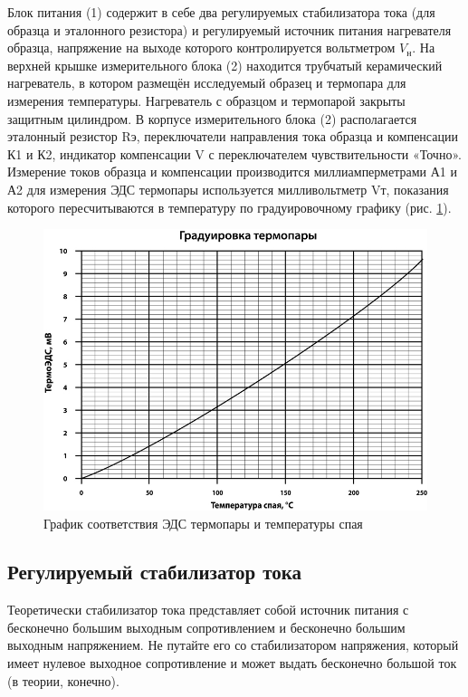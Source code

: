 		Блок питания (1) содержит в себе два регулируемых стабилизатора тока (для образца и эталонного резистора) и регулируемый
		источник питания нагревателя образца, напряжение на выходе которого контролируется вольтметром $V_\text{н}$. На верхней
		крышке измерительного блока (2) находится трубчатый керамический нагреватель, в котором размещён исследуемый образец и
		термопара для измерения температуры. Нагреватель с образцом и термопарой закрыты защитным цилиндром. В корпусе
		измерительного блока (2) располагается эталонный резистор Rэ, переключатели направления тока образца и компенсации К1 и
		К2, индикатор компенсации V с переключателем чувствительности «Точно». Измерение токов образца и компенсации
		производится миллиамперметрами А1 и А2 для измерения ЭДС термопары используется милливольтметр Vт, показания которого
		пересчитываются в температуру по градуировочному графику (рис. \ref{fig:6.3}).
		
		\begin{figure}[h!]
			\centering
			\includegraphics[width = .9\linewidth]{img/grad.jpg}
			\caption{График соответствия ЭДС термопары и температуры спая}
			\label{fig:6.3}
		\end{figure}
		
		
		\subsection{Регулируемый стабилизатор тока}
		Теоретически стабилизатор тока представляет собой источник питания с бесконечно большим выходным сопротивлением и
		бесконечно большим выходным напряжением. Не путайте его со стабилизатором напряжения, который имеет нулевое выходное
		сопротивление и может выдать бесконечно большой ток (в теории, конечно).
		
